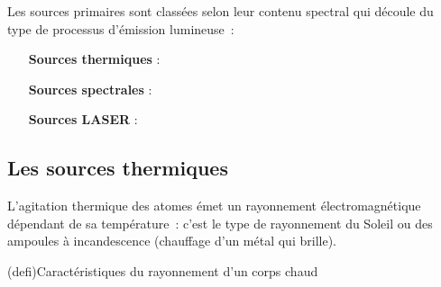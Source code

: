 \documentclass[../../main/main.tex]{subfiles}
\begin{document}
Les sources primaires sont classées selon leur contenu spectral
qui découle du type de processus d'émission lumineuse~:
\begin{itemize}[leftmargin=120pt]
	\item[\textbf{Sources thermiques}] : 
	\item[\textbf{Sources spectrales}] : 
	\item[\textbf{Sources LASER}] : 
\end{itemize}

\subsection{Les sources thermiques}

L'agitation thermique des atomes émet un rayonnement électromagnétique dépendant
de sa température~: c'est le type de rayonnement du Soleil ou des ampoules à
incandescence (chauffage d'un métal qui brille).

\begin{tcb}(defi){Caractéristiques du rayonnement d'un corps chaud}

\end{tcb}
\end{document}

